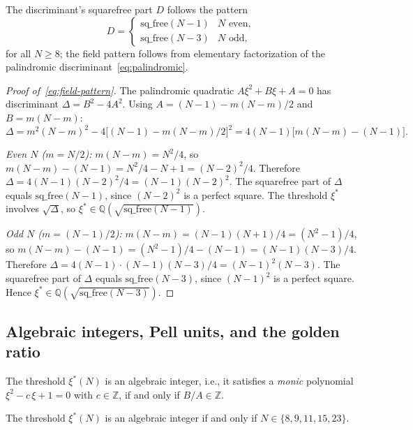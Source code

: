 \noindent
The discriminant's squarefree part $D$ follows the pattern
\begin{equation}\label{eq:field-pattern}
  D = \begin{cases}
    \mathrm{sq\_free}(N-1) & N \text{ even}, \\
    \mathrm{sq\_free}(N-3) & N \text{ odd},
  \end{cases}
\end{equation}
for all $N \ge 8$; the field pattern follows from
elementary factorization of the palindromic
discriminant~\eqref{eq:palindromic}.

\begin{proof}[Proof of~\eqref{eq:field-pattern}]
The palindromic quadratic $A\xi^2 + B\xi + A = 0$ has discriminant
$\Delta = B^2 - 4A^2$.  Using $A = (N{-}1) - m(N{-}m)/2$ and
$B = m(N{-}m)$:
\[
  \Delta = m^2(N{-}m)^2 - 4\bigl[(N{-}1) - m(N{-}m)/2\bigr]^2
  = 4(N{-}1)\bigl[m(N{-}m) - (N{-}1)\bigr].
\]

\emph{Even $N$ ($m = N/2$):}
$m(N{-}m) = N^2/4$, so
$m(N{-}m) - (N{-}1) = N^2/4 - N + 1 = (N{-}2)^2/4$.
Therefore
$\Delta = 4(N{-}1)(N{-}2)^2/4 = (N{-}1)(N{-}2)^2$.
The squarefree part of $\Delta$ equals
$\mathrm{sq\_free}(N{-}1)$, since $(N{-}2)^2$ is a perfect square.
The threshold $\xi^*$ involves $\sqrt\Delta$, so
$\xi^* \in \mathbb{Q}(\sqrt{\mathrm{sq\_free}(N{-}1)})$.

\emph{Odd $N$ ($m = (N{-}1)/2$):}
$m(N{-}m) = (N{-}1)(N{+}1)/4 = (N^2{-}1)/4$, so
$m(N{-}m) - (N{-}1) = (N^2{-}1)/4 - (N{-}1) = (N{-}1)(N{-}3)/4$.
Therefore
$\Delta = 4(N{-}1) \cdot (N{-}1)(N{-}3)/4 = (N{-}1)^2(N{-}3)$.
The squarefree part of $\Delta$ equals
$\mathrm{sq\_free}(N{-}3)$, since $(N{-}1)^2$ is a perfect square.
Hence $\xi^* \in \mathbb{Q}(\sqrt{\mathrm{sq\_free}(N{-}3)})$.
\end{proof}

\subsection{Algebraic integers, Pell units, and the golden ratio}
The threshold $\xi^*(N)$ is an algebraic integer, i.e., it
satisfies a \emph{monic} polynomial $\xi^2 - c\,\xi + 1 = 0$ with
$c \in \mathbb{Z}$, if and only if $B/A \in \mathbb{Z}$.

\begin{proposition}
\label{prop:alg-int}
The threshold $\xi^*(N)$ is an algebraic integer if and only if
$N \in \{8, 9, 11, 15, 23\}$.
\end{proposition}

